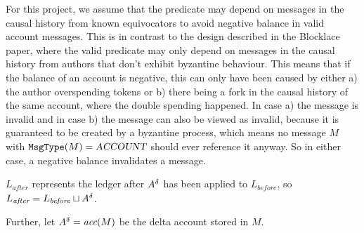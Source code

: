 \documentclass{article}
\begin{document}
For this project, we assume that the predicate  may depend on messages in the causal history from known equivocators to avoid negative balance in valid account messages. This is in contrast to the design described in the Blocklace paper, where the valid predicate may only depend on messages in the causal history from authors that don't exhibit byzantine behaviour. This means that if the balance of an account is negative, this can only have been caused by either a) the author overspending tokens or b) there being a fork in the causal history of the same account, where the double spending happened. In case a) the message is invalid and in case b) the message can also be viewed as invalid, because it is guaranteed to be created by a byzantine process, which means no message $M$ with $\texttt{MsgType}(M) = \textsl{ACCOUNT}$ should ever reference it anyway. So in either case, a negative balance invalidates a message.

$L_\textit{after}$ represents the ledger after $A^\delta$ has been applied to $L_\textit{before}$, so $L_\emph{after} = L_\emph{before} \sqcup A^\delta$. 

Further, let $A^\delta = \textit{acc}(M)$ be the delta account stored in $M$.
\end{document}
